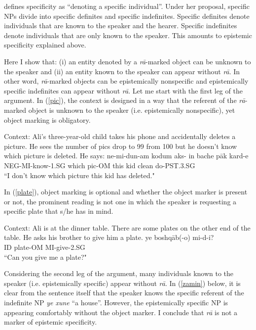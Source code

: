 \documentclass[12pt]{article}
\begin{document}
\cite{karimi1990obliqueness} defines specificity as ``denoting a specific individual''. Under her proposal, specific NPs divide into specific definites and specific indefinites. Specific definites denote individuals that are known to the speaker and the hearer. Specific indefinites denote individuals that are only known to the speaker. This amounts to epistemic specificity explained above.

Here I show that: (i) an entity denoted by a \emph{r\={a}}-marked object can be unknown to the speaker and (ii) an entity known to the speaker can appear without \emph{r\={a}}. In other word, \emph{r\={a}}-marked objects can be epistemically nonspecific and epistemically specific indefinites can appear without \emph{r\={a}}. Let me start with the first leg of the argument. In (\ref{pic}), the context is designed in a way that the referent of the \emph{r\={a}}-marked object is unknown to the speaker (i.e. epistemically nonspecific), yet object marking is obligatory.

    	\begin {exe}
    		\ex	\label {pic} {\footnotesize Context: Ali's three-year-old child takes his phone and accidentally deletes a picture. He sees the number of pics drop to 99 from 100 but he doesn't know which picture is deleted. He says: }
    		\gll	ne-mi-dun-am kodum aks- in	bache p\={a}k kard-e\\
    			{\scriptsize NEG-MI}-know-{\scriptsize 1.SG}	which 	pic-{\scriptsize OM} this	kid	clean	do{\scriptsize -PST.3.SG}\\
    		\glt 	``I don't know which picture this kid has deleted."
    	\end {exe}

In (\ref{plate}), object marking is optional and whether the object marker is present or not, the prominent reading is not one in which the speaker is requesting a specific plate that s/he has in mind. 

    	\begin {exe}
    		\ex \label{plate}	{\footnotesize Context: Ali is at the dinner table. There are some plates on the other end of the table. He asks his brother to give him a plate.}
    		\gll	ye boshq\={a}b(-o) mi-d-i?\\
    			{\scriptsize ID}	plate-{\scriptsize OM}	MI-give-{\scriptsize 2.SG}\\
    		\glt 	``Can you give me a plate?"
    	\end {exe}

Considering the second leg of the argument, many individuals known to the speaker (i.e. epistemically specific) appear without \emph{r\={a}}. In (\ref{zamin}) below, it is clear from the sentence itself that the speaker knows the specific referent of the indefinite NP \emph{ye xune} ``a house''. However, the epistemically specific NP is appearing comfortably without the object marker. I conclude that \emph{r\={a}} is not a marker of epistemic specificity. 
\end{document}
